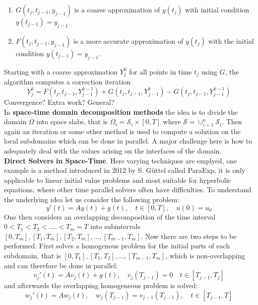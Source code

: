 \documentclass[fleqn, a4paper, 11pt, bibliography=totoc]{report}
\begin{document}
\begin{enumerate}
	\item $G(t_j, t_{j-1}, y_{j-1})$ is a coarse approximation of $y(t_j)$ with initial condition $y(t_{j-1}) = y_{j-1} $
	\item $F(t_j, t_{j-1}, y_{j-1})$ is a more accurate approximation of $y(t_j)$ with the initial condition $y(t_{j-1}) = y_{j-1}$.
\end{enumerate}
Starting with a coarse approximation $Y_j^0$ for all points in time $t_j$ using $G$, the algorithm computes a correction iteration 
\begin{equation*}
Y_{j}^{k} = F(t_j, t_{j-1}, Y_{j-1}^{k-1}) + G(t_j, t_{j-1}, Y_{j-1}^{k}) - G(t_j, t_{j-1}, Y_{j-1}^{k-1})
\end{equation*}
Convergence? Extra work? General?
\smallskip
\\
In \textbf{space-time domain decomposition methods} the idea is to divide the domain $\Omega$ into space slabs, that is $\Omega_i = \mathcal{S}_i \times [0,T]$ where $\mathcal{S} = \cup_{i=1}^n \mathcal{S}_i$. Then again an iteration or some other method is used to compute a solution on the local subdomains which can be done in parallel. A major challenge here is how to adequately deal with the values arising on the interfaces of the domain. 
\smallskip
\\
\textbf{Direct Solvers in Space-Time}. Here varying techniques are emplyed, one example is a method introduced in 2012 by S. G\"uttel called ParaExp, it is only applicable to linear initial value problems and most suitable for hyperbolic equations, where other time parallel solvers often have difficulties. To understand the underlying idea let us consider the following problem:
\begin{equation}
y'(t) = Ay(t) + g(t), \quad t \in [0,T], \quad u(0) = u_0
\end{equation}
One then considers an overlapping decomposition of the time interval $0 < T_1 < T_2 < .... < T_m = T$ into subintervals $[0, T_m], [T_1, T_m], [T_2, T_m], ..., [T_{m-1}, T_m]$. Now there are two steps to be performed. First solves a homogenous problem for the initial parts of each subdomain, that is $[0,T_1], [T_1, T_2], ... , [T_{m-1}, T_m]$, which is non-overlapping and can therefore be done in parallel:
\begin{equation}
v_j'(t) = A v_j(t) + g(t), \quad v_j(T_{j-1}) = 0 \quad t \in [T_{j-1}, T_j]
\end{equation}
and afterwards the overlapping homogeneous problem is solved:
\begin{equation}
w_j'(t) = A w_j(t), \quad w_j(T_{j-1}) = v_{j-1}(T_{j-1}), \quad t \in [T_{j-1}, T]
\end{equation}
\end{document}
